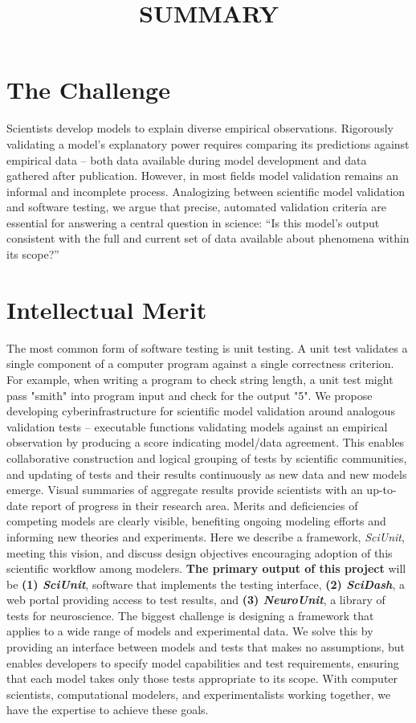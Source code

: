 \documentclass[11pt,letterpaper]{article}
\begin{document}
\title{SUMMARY}

\section{The Challenge}
Scientists develop models to explain diverse empirical observations. 
Rigorously validating a model’s explanatory power requires comparing its predictions against empirical data -- both data available during model development and data gathered after publication. 
However, in most fields model validation remains an informal and incomplete process. 
Analogizing between scientific model validation and software testing, we argue that precise, automated validation criteria are essential for answering a central question in science: 
“Is this model's output consistent with the full and current set of data available about phenomena within its scope?” 

\section{Intellectual Merit}
The most common form of software testing is unit testing. 
A unit test validates a single component of a computer program against a single correctness criterion. 
For example, when writing a program to check string length, a unit test might pass "smith" into program input and check for the output "5".   
We propose developing cyberinfrastructure for scientific model validation around analogous validation tests -- 
executable functions validating models against an empirical observation by producing a score indicating model/data agreement. 
This enables collaborative construction and logical grouping of tests by scientific communities, and updating of tests and their results continuously as new data and new models emerge. 
Visual summaries of aggregate results provide scientists with an up-to-date report of progress in their research area. 
Merits and deficiencies of competing models are clearly visible, benefiting ongoing modeling efforts and informing new theories and experiments. 
Here we describe a framework, \textit{SciUnit}, meeting this vision, and discuss design objectives encouraging adoption of this scientific workflow among modelers. 
\textbf{The primary output of this project} will be \textbf{(1) \textit{SciUnit}}, software that implements the testing interface, \textbf{(2) \textit{SciDash}}, a web portal providing access to test results, and \textbf{(3) \textit{NeuroUnit}}, a library of tests for neuroscience.  
The biggest challenge is designing a framework that applies to a wide range of models and experimental data.  
We solve this by providing an interface between models and tests that makes no assumptions, but enables developers to specify model capabilities and test requirements, ensuring that each model takes only those tests appropriate to its scope.  
With computer scientists, computational modelers, and experimentalists working together, we have the expertise to achieve these goals. 
\end{document}
